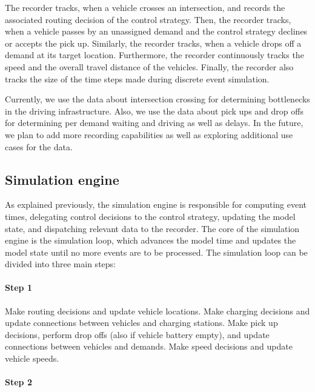 \documentclass[a4paper,twoside]{article}
\begin{document}
	The recorder tracks, when a vehicle crosses an intersection, and records the associated routing decision of the control strategy.
	Then, the recorder tracks, when a vehicle passes by an unassigned demand and the control strategy declines or accepts the pick up.
	Similarly, the recorder tracks, when a vehicle drops off a demand at its target location.
	Furthermore, the recorder continuously tracks the speed and the overall travel distance of the vehicles.
	Finally, the recorder also tracks the size of the time steps made during discrete event simulation.
	
	Currently, we use the data about intersection crossing for determining bottlenecks in the driving infrastructure.
	Also, we use the data about pick ups and drop offs for determining per demand waiting and driving as well as delays.
	In the future, we plan to add more recording capabilities as well as exploring additional use cases for the data.
	
	\subsection{Simulation engine}
	\label{sec:simulation-engine}

	
	As explained previously, the simulation engine is responsible for computing event times, delegating control decisions to the control strategy, updating the model state, and dispatching relevant data to the recorder.
	The core of the simulation engine is the simulation loop, which advances the model time and updates the model state until no more events are to be processed.
	The simulation loop can be divided into three main steps:
	
	\paragraph{Step 1}
	
	Make routing decisions and update vehicle locations.
	Make charging decisions and update connections between vehicles and charging stations.
	Make pick up decisions, perform drop offs (also if vehicle battery empty), and update connections between vehicles and demands.
	Make speed decisions and update vehicle speeds.
	
	\paragraph{Step 2}
	
\end{document}
